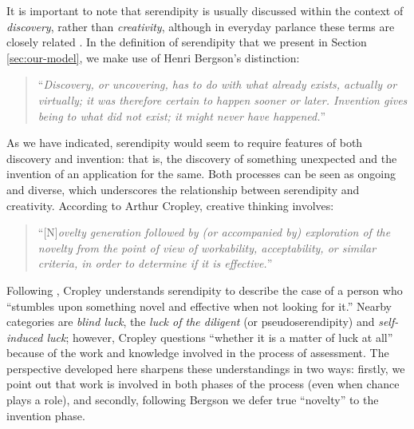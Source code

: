 It is important to note that serendipity is usually discussed within
the context of \emph{discovery}, rather than \emph{creativity},
although in everyday parlance these terms are closely related
\cite{jordanous12jims}.  In the definition of serendipity that we present in Section \ref{sec:our-model}, we make use
of Henri Bergson's distinction:
\begin{quote}
``\emph{Discovery, or uncovering, has to do with what already exists,
    actually or virtually; it was therefore certain to happen sooner
    or later.  Invention gives being to what did not exist; it might
    never have happened.}''~\cite[p. 58]{bergson2010creative}
\end{quote}
As we have indicated, serendipity would seem to require features of
both discovery and invention: that is, the discovery of something
unexpected and the invention of an application for the same.  Both
processes can be seen as ongoing and diverse, which underscores the
relationship between serendipity and creativity.  According to Arthur
Cropley, creative thinking involves:
\begin{quote}
``{[}N{]}\emph{ovelty generation followed by (or accompanied by) exploration of the novelty from the point of view of workability, acceptability, or similar criteria, in order to determine if it is effective.}'' \citeyear{cropley2006praise}
\end{quote}
Following , Cropley understands serendipity to
describe the case of a person who ``stumbles upon something novel and
effective when not looking for it.''  Nearby categories are
\emph{blind luck}, the \emph{luck of the diligent} (or
pseudoserendipity) and \emph{self-induced luck}; however, Cropley
questions ``whether it is a matter of luck at all'' because of the
work and knowledge involved in the process of assessment.
%
The perspective developed here sharpens these understandings in two ways:
firstly, we point out that work is involved in both phases of the process (even when chance plays a role), and secondly, following Bergson we defer true ``novelty'' to the invention phase.
 
